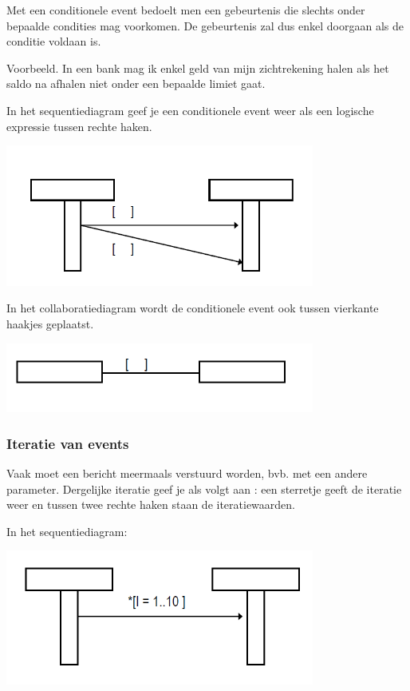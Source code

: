 Met een conditionele event bedoelt men een gebeurtenis die slechts onder bepaalde condities mag voorkomen. De gebeurtenis zal dus enkel doorgaan als de conditie voldaan is.

Voorbeeld. In een bank mag ik enkel geld van mijn zichtrekening halen als het saldo na afhalen niet onder een bepaalde limiet gaat.

In het sequentiediagram geef je een conditionele event weer als een logische expressie tussen rechte haken.


\begin{center}
\includegraphics[width=4in]{img/cond1}%
\end{center}

In het collaboratiediagram wordt de conditionele event ook tussen vierkante haakjes geplaatst.


\begin{center}
\includegraphics[width=4in]{img/cond2}%
\end{center}

\subsubsection{Iteratie van events}

Vaak moet een bericht meermaals verstuurd worden, bvb. met een andere parameter. Dergelijke iteratie geef je als volgt aan : een sterretje geeft de iteratie weer en tussen twee rechte haken staan de iteratiewaarden.

In het sequentiediagram:


\begin{center}
\includegraphics[width=4in]{img/iter1}%
\end{center}

